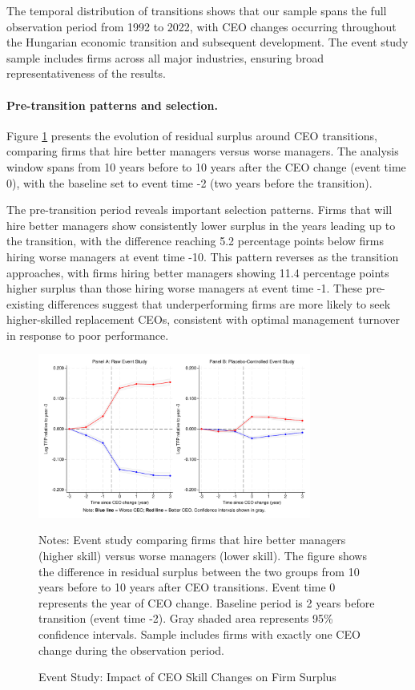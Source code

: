 \documentclass[11pt,a4paper]{article}
\begin{document}
The temporal distribution of transitions shows that our sample spans the full observation period from 1992 to 2022, with CEO changes occurring throughout the Hungarian economic transition and subsequent development. The event study sample includes firms across all major industries, ensuring broad representativeness of the results.

\paragraph{Pre-transition patterns and selection.} Figure \ref{fig:event_study} presents the evolution of residual surplus around CEO transitions, comparing firms that hire better managers versus worse managers. The analysis window spans from 10 years before to 10 years after the CEO change (event time 0), with the baseline set to event time -2 (two years before the transition).

The pre-transition period reveals important selection patterns. Firms that will hire better managers show consistently lower surplus in the years leading up to the transition, with the difference reaching 5.2 percentage points below firms hiring worse managers at event time -10. This pattern reverses as the transition approaches, with firms hiring better managers showing 11.4 percentage points higher surplus than those hiring worse managers at event time -1. These pre-existing differences suggest that underperforming firms are more likely to seek higher-skilled replacement CEOs, consistent with optimal management turnover in response to poor performance.

\begin{figure}[htbp]
\centering
\includegraphics[width=0.8\textwidth]{figure/event_study.pdf}
\caption{Event Study: Impact of CEO Skill Changes on Firm Surplus}
\label{fig:event_study}
\footnotesize
Notes: Event study comparing firms that hire better managers (higher skill) versus worse managers (lower skill). The figure shows the difference in residual surplus between the two groups from 10 years before to 10 years after CEO transitions. Event time 0 represents the year of CEO change. Baseline period is 2 years before transition (event time -2). Gray shaded area represents 95\% confidence intervals. Sample includes firms with exactly one CEO change during the observation period.
\end{figure}
\end{document}
